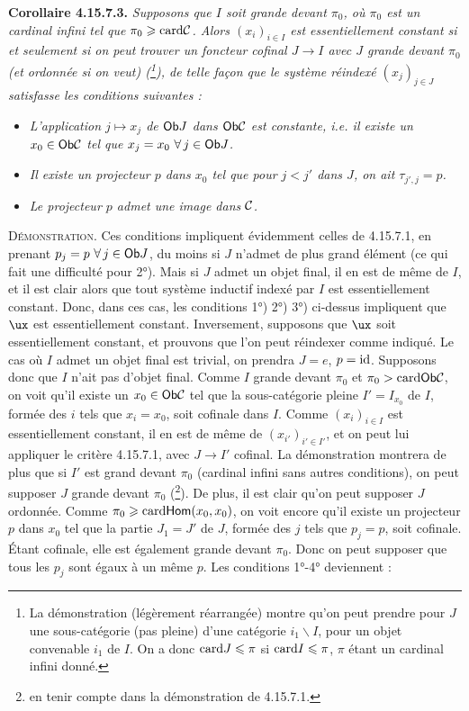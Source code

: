 \textbf{Corollaire 4.15.7.3.} \textit{Supposons que $I$ soit grande devant $\pi_0$, où $\pi_0$ est un cardinal infini tel que $\pi_0 \geqslant \mathrm{card} \mathcal{C}$. Alors $(x_i)_{i\in I}$ est essentiellement constant si et seulement si on peut trouver un foncteur cofinal $J \longrightarrow I$ avec $J$ grande devant $\pi_0$ (et ordonnée si on veut) (\footnote{La démonstration (légèrement réarrangée) montre qu'on peut prendre pour $J$ une sous-catégorie (pas pleine) d'une catégorie $i_1\backslash I$, pour un objet convenable $i_1$ de $I$. On a donc $\mathrm{card} J \leqslant \pi$ si $\mathrm{card} I \leqslant \pi$, $\pi$ étant un cardinal infini donné.}), de telle façon que le système réindexé $(x_j)_{j\in J}$ satisfasse les conditions suivantes :}
\begin{itemize}
\item[\textit{1°)}] \textit{L'application $j \longmapsto x_j$ de $\mathsf{Ob} J$ dans $\mathsf{Ob}\mathcal{C}$ est constante, i.e. il existe un $x_0 \in \mathsf{Ob}\mathcal{C}$ tel que $x_j = x_0\ \forall\, j \in \mathsf{Ob} J$.}
\item[\textit{2°)}] \textit{Il existe un projecteur $p$ dans $x_0$ tel que pour $j < j'$ dans $J$, on ait $\tau_{j',j} = p$.}
\item[\textit{3°)}] \textit{Le projecteur $p$ admet une image dans $\mathcal{C}$.}
\end{itemize}
\textsc{Démonstration}. Ces conditions impliquent évidemment celles de 4.15.7.1, en prenant $p_j = p\ \forall\, j \in \mathsf{Ob} J$, du moins si $J$ n'admet de plus grand élément (ce qui fait une difficulté pour 2°). Mais si $J$ admet un objet final, il en est de même de $I$, et il est clair alors que tout système inductif indexé par $I$ est essentiellement constant. Donc, dans ces cas, les conditions 1°) 2°) 3°) ci-dessus impliquent que $\ux$ est essentiellement constant. Inversement, supposons que $\ux$ soit essentiellement constant, et prouvons que l'on peut réindexer comme indiqué. Le cas où $I$ admet un objet final est trivial, on prendra $J = e$, $p = \mathrm{id}$. Supposons donc que $I$ n'ait pas d'objet final. Comme $I$ grande devant $\pi_0$ et $\pi_0 > \mathrm{card}\mathsf{Ob}\mathcal{C}$, on voit qu'il existe un $x_0 \in \mathsf{Ob}\mathcal{C}$ tel que la sous-catégorie pleine $I' = I_{x_0}$ de $I$, formée des $i$ tels que $x_i = x_0$, soit cofinale dans $I$. Comme $(x_i)_{i\in I}$ est essentiellement constant, il en est de même de $(x_{i'})_{i'\in I'}$, et on peut lui appliquer le critère 4.15.7.1, avec \marginpar{$\Vert$}%
$J \longrightarrow I'$ cofinal. La démonstration montrera de plus que si $I'$ est grand devant $\pi_0$ (cardinal infini sans autres conditions), on peut supposer $J$ grande devant $\pi_0$ (\footnote{en tenir compte dans la démonstration de 4.15.7.1.}). De plus, il est clair qu'on peut supposer $J$ ordonnée. Comme $\pi_0 \geqslant \mathrm{card}\mathsf{Hom}(x_0,x_0)$, on voit encore qu'il existe un projecteur $p$ dans $x_0$ tel que la partie $J_1 = J'$ de $J$, formée des $j$ tels que $p_j = p$, soit cofinale. Étant cofinale, elle est également grande devant $\pi_0$. Donc on peut supposer que tous les $p_j$ sont égaux à un même $p$. Les conditions 1°-4° deviennent :
